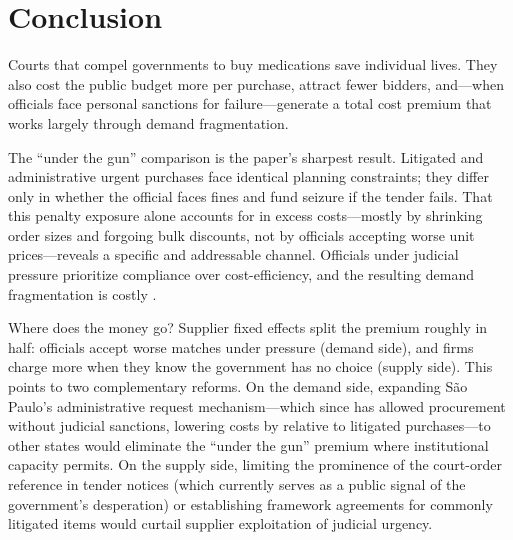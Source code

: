 \section{Conclusion}
\label{sec:conclusion}

Courts that compel governments to buy medications save individual lives. They also cost the public budget \BPnegPctHeadline{} more per purchase, attract \BPfirmsPctHeadline{} fewer bidders, and---when officials face personal sanctions for failure---generate a \BPutgPctRange{} total cost premium that works largely through demand fragmentation.

The ``under the gun'' comparison is the paper's sharpest result. Litigated and administrative urgent purchases face identical planning constraints; they differ only in whether the official faces fines and fund seizure if the tender fails. That this penalty exposure alone accounts for \BPutgPctRange{} in excess costs---mostly by shrinking order sizes and forgoing bulk discounts, not by officials accepting worse unit prices---reveals a specific and addressable channel. Officials under judicial pressure prioritize compliance over cost-efficiency, and the resulting demand fragmentation is costly \citep{prendergast2007bureaucrats, rasul2018management}.

Where does the money go? Supplier fixed effects split the premium roughly in half: officials accept worse matches under pressure (demand side), and firms charge more when they know the government has no choice (supply side). This points to two complementary reforms. On the demand side, expanding S\~ao Paulo's administrative request mechanism---which since \BPsampleStartYear{} has allowed procurement without judicial sanctions, lowering costs by \BPutgPctRange{} relative to litigated purchases---to other states would eliminate the ``under the gun'' premium where institutional capacity permits. On the supply side, limiting the prominence of the court-order reference in tender notices (which currently serves as a public signal of the government's desperation) or establishing framework agreements for commonly litigated items would curtail supplier exploitation of judicial urgency.

